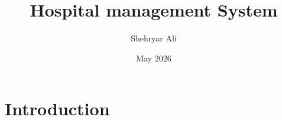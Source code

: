 \documentclass{article}
\title{Hospital management System}
\author{Shehryar Ali}
\date{May 2026}
\begin{document}
\maketitle

\section{Introduction}
\end{document}
